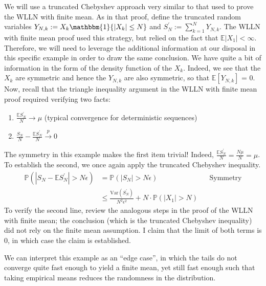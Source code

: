 \documentclass[12pt]{article}
\newcommand*{\abs}[1]{\left\lvert#1\right\rvert}
\newcommand{\E}{\mathbb{E}}
\newcommand{\Var}{\mathrm{Var}}
\newcommand{\Prob}{\mathbb{P}}
\begin{document}
We will use a truncated Chebyshev approach very similar to that used to prove the WLLN with finite mean. As in that proof, define the truncated random variables $Y_{N,k} := X_k \mathbbm{1}\{\abs{X_k} \leq N\}$ and 
$S_N^\prime := \sum_{k = 1}^{N} Y_{N, k}$. The WLLN with finite mean proof used this strategy, but relied on the fact that $\E\abs{X_1} < \infty$. Therefore, we will need to leverage the additional information at our disposal 
in this specific example in order to draw the same conclusion. We have quite a bit of information in the form of the density function of the $X_k$. Indeed, we see that the $X_k$ are symmetric and hence the $Y_{N, k}$ are 
also symmetric, so that $\E[Y_{N, k}]$ = 0. Now, recall that the triangle inequality argument in the WLLN with finite mean proof required verifying two facts: 
 \begin{enumerate}
 \item $\frac{\E S_N^\prime}{N} \to \mu$ (typical convergence for deterministic sequences)
 \item $\frac{S_N}{N} - \frac{\E S_N^\prime}{N} \overset{p}{\to} 0$
 \end{enumerate}
 The symmetry in this example makes the first item trivial! Indeed, $\frac{\E S_N^\prime}{N} = \frac{N \mu}{N} = \mu$. To establish the second, we once again apply the truncated Chebyshev inequality. 
 \begin{align*}
 \Prob(\abs{S_N - \E S_N^\prime} > N\epsilon) &= \Prob(\abs{S_N} > N\epsilon) && \text{Symmetry} \\
 								      &\leq \frac{\Var(S_N^\prime)}{N^2 \epsilon^2} + N \cdot \Prob(\abs{X_1} > N)
 \end{align*}
 To verify the second line, review the analogous steps in the proof of the WLLN with finite mean; the conclusion (which is the truncated Chebyshev inequality) did not rely on the finite mean assumption. I claim that the limit 
 of both terms is $0$, in which case the claim is established. 


We can interpret this example as an ``edge case'', in which the tails do not converge quite fast enough to yield a finite mean, yet still fast enough such that taking empirical means reduces the randomness in the distribution. 
\end{document}
